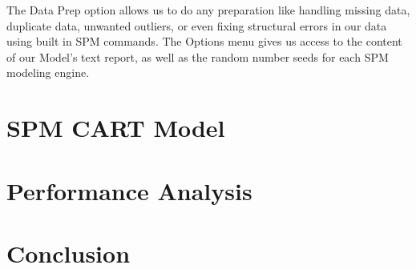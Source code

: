 \documentclass[12pt]{amsart}
\begin{document}
The Data Prep option allows us to do any preparation like handling missing data, duplicate data, unwanted outliers, or even 
fixing structural errors in our data using built in SPM commands. The Options menu gives us access to the content of our Model's text
report, as well as the random number seeds for each SPM modeling engine. 
\section{SPM CART Model}


\section{Performance Analysis}


\section{Conclusion}
\end{document}
